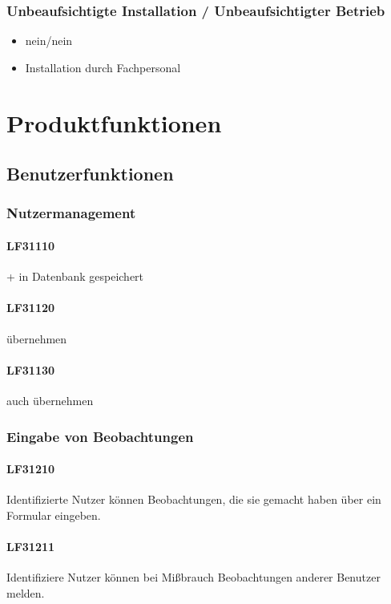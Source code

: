 \documentclass[a4paper,11pt]{article}             %
\begin{document}
		\subsubsection{Unbeaufsichtigte Installation / Unbeaufsichtigter Betrieb}
			\begin{itemize}
				\item nein/nein
				\item Installation durch Fachpersonal
			\end{itemize}



\section{Produktfunktionen}
	\subsection{Benutzerfunktionen}
		\subsubsection{Nutzermanagement}
			\paragraph{LF31110}
				+ in Datenbank gespeichert
			\paragraph{LF31120}
				übernehmen
			\paragraph{LF31130}
				auch übernehmen

		\subsubsection{Eingabe von Beobachtungen}
			\paragraph{LF31210}
				Identifizierte Nutzer können Beobachtungen, die sie gemacht haben über ein Formular eingeben.
			\paragraph{LF31211}
				Identifiziere Nutzer können bei Mißbrauch Beobachtungen anderer Benutzer melden.
\end{document}
